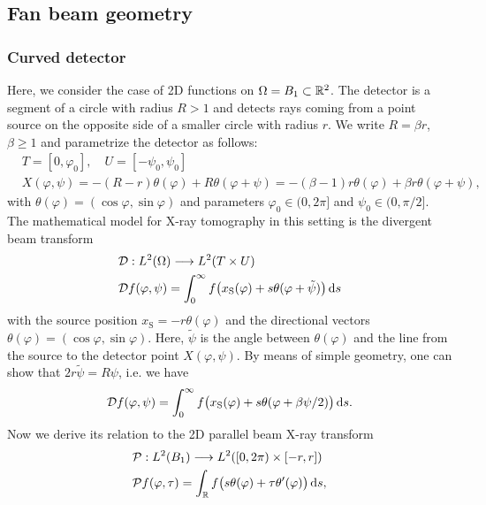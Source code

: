 \documentclass{amsart}
\renewcommand*{\phi}{\varphi}
\begin{document}
\subsection{Fan beam geometry}
\label{sec:applications:fanbeam}

\subsubsection{Curved detector}
\label{sec:applications:fanbeam:curved}

Here, we consider the case of 2D functions on $\Omega = B_1 \subset {\ensuremath{\mathbb{R}}}^2$. The detector is a segment of a circle with radius $R > 1$ and 
detects rays coming from a point source on the opposite side of a smaller circle with radius $r$. We write $R = \beta r$, $\beta \geq 1$ 
and parametrize the detector as follows:
%
\begin{align*}
 & T = [0, \phi_0],\quad U = [-\psi_0, \psi_0] \\
 & X(\phi, \psi) = -(R - r) \theta(\phi) + R \theta(\phi + \psi) = -(\beta - 1) r \theta(\phi) + \beta r \theta(\phi + \psi),
\end{align*}
%
with $\theta(\phi) = (\cos\phi, \sin\phi)$ and parameters $\phi_0 \in (0, 2\pi]$ and $\psi_0 \in (0, \pi/2]$. The mathematical model 
for X-ray tomography in this setting is the divergent beam transform
%
\begin{align}
 &\OPD: L^2(\Omega) \Lto L^2(T \times U) \notag\\
 \label{eq:fancurved:fwdproj_otherangle}
 &\OPD f(\phi, \psi) = \int_0^\infty f\big(x_{\mathrm{S}}(\phi) + s \theta(\phi + \tilde\psi)\big)\, \D s
\end{align}
%
with the source position $x_{\mathrm{S}} = -r \theta(\phi)$ and the directional vectors $\theta(\phi) = (\cos\phi, \sin\phi)$. Here, 
$\tilde\psi$ is the angle between $\theta(\phi)$ and the line from the source to the detector point $X(\phi, \psi)$. By means of simple 
geometry, one can show that $2r \tilde\psi = R\psi$, i.e. we have
%
\begin{equation}
 \label{eq:fancurved:fwdproj_realangle}
 \OPD f(\phi, \psi) = \int_0^\infty f\big(x_{\mathrm{S}}(\phi) + s \theta(\phi + \beta\psi/2)\big)\, \D s.
\end{equation} 
%
Now we derive its relation to the 2D parallel beam X-ray transform
%
\begin{align}
 &\OPP: L^2(B_1) \Lto L^2([0,2\pi) \times [-r,r]) \notag \\
 \label{eq:fancurved:xray_fwdproj}
 &\OPP f(\phi, \tau) = \int_\RR f\big(s\theta(\phi) + \tau \theta'(\phi)\big)\, \D s,
\end{align} 
\end{document}
